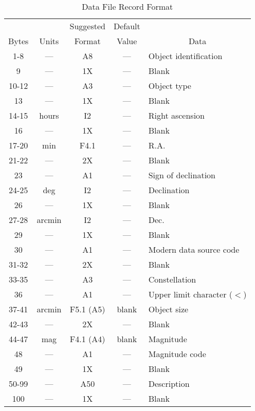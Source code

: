 \begin{table}[htbp]
\centering
\begin{tabular}{|c|c|c|c|l|}
\hline
       &       & Suggested & Default &                            \\
 Bytes & Units &   Format  &  Value  & \multicolumn{1}{c|}{Data}  \\
\hline
  1-8  & ---    &   A8     &   ---   & Object identification     \\
  9    & ---    &   1X     &   ---   & Blank                     \\
 10-12 & ---    &   A3     &   ---   & Object type               \\
 13    & ---    &   1X     &   ---   & Blank                     \\
 14-15 & hours  &   I2     &   ---   & Right ascension           \\
 16    & ---    &   1X     &   ---   & Blank                     \\
 17-20 & min    &   F4.1   &   ---   & R.A.                      \\
 21-22 & ---    &   2X     &   ---   & Blank                     \\
 23    & ---    &   A1     &   ---   & Sign of declination       \\
 24-25 & deg    &   I2     &   ---   & Declination               \\
 26    & ---    &   1X     &   ---   & Blank                     \\
 27-28 & arcmin &   I2     &   ---   & Dec.                      \\
 29    & ---    &   1X     &   ---   & Blank                     \\
 30    & ---    &   A1     &   ---   & Modern data source code   \\
 31-32 & ---    &   2X     &   ---   & Blank                     \\
 33-35 & ---    &   A3     &   ---   & Constellation             \\
 36    & ---    &   A1     &   ---   & Upper limit character ($<$) \\
 37-41 & arcmin & F5.1 (A5)&  blank  & Object size               \\
 42-43 & ---    &   2X     &   ---   & Blank                     \\
 44-47 & mag    & F4.1 (A4)&  blank  & Magnitude                 \\
 48    & ---    &   A1     &   ---   & Magnitude code            \\
 49    & ---    &   1X     &   ---   & Blank                     \\
 50-99 & ---    &   A50    &   ---   & Description               \\
 100   & ---    &   1X     &   ---   & Blank                     \\
\hline
\end{tabular}
\caption{Data File Record Format}
\label{t:cattab}
\end{table}

